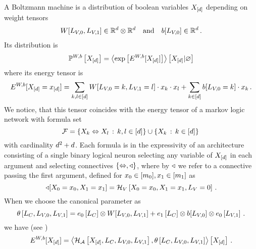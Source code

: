 A Boltzmann machine is a distribution of boolean variables $X_{[d]}$ depending on weight tensors %
\begin{align*}
	W[L_{V,0},L_{V,1}] \in\mathbb{R}^{d}\otimes\mathbb{R}^{d} \quad \text{and} \quad b[L_{V,0}] \in\mathbb{R}^{d} \, .
\end{align*}
Its distribution is
\begin{align*}
	\mathbb{P}^{W,b}\left[X_{[d]}\right] = \left\langle \mathrm{exp}\left[E^{W,b}[X_{[d]}]\right]\right\rangle \left[ X_{[d]} | \varnothing \right]
\end{align*}
where its energy tensor is
	\[ E^{W,b}[X_{[d]}=x_{[d]}] =
	\sum_{k,l \in [d]} 
		W[L_{V,0}=k, L_{V,1}=l] \cdot x_{k} \cdot x_{l} 
	+ \sum_{k\in[d]} b[L_{V,0}=k] \cdot x_{k}\, . \]
We notice, that this tensor coincides with the energy tensor of a markov logic network with formula set
	\[ \mathcal{F} = \{ X_{k} \Leftrightarrow X_{l} \, : \, k,l \in[d] \} 
	\cup \{ X_{k}\, : \, k\in[d] \} \, \]
with cardinality $d^2+d$.
Each formula is in the expressivity of an architecture consisting of a single binary logical neuron selecting any variable of $X_{[d]}$ in each argument and selecting connectives $\{\Leftrightarrow,\triangleleft\}$, where by $\triangleleft$ we refer to a connective passing the first argument, defined for $x_{0}\in[m_{0}], x_{1}\in[m_{1}]$ as 
	\[ \triangleleft[X_{0}=x_{0},X_{1}=x_{1}] = \mathcal{H}_{V}\left[X_{0}=x_{0},X_{1}=x_{1},L_{V}=0\right] \, . \]
When we choose the canonical parameter as
	\[ \theta\left[L_{C},L_{V,0},L_{V,1}\right]
	= e_{0}\left[L_{C}\right] \otimes W[L_{V,0},L_{V,1}]
	+ e_{1}\left[L_{C}\right] \otimes b[L_{V,0}] \otimes  e_{0}\left[L_{V,1}\right] \, .
	\]
we have (see )
	\[ E^{W,b}[X_{[d]}] = 
	\left\langle \mathcal{H}_{\mathcal{A}}\left[X_{[d]},L_{C},L_{V,0},L_{V,1}\right],
		\theta\left[L_{C},L_{V,0},L_{V,1}\right]\right\rangle \left[ X_{[d]} \right] \, . \]

